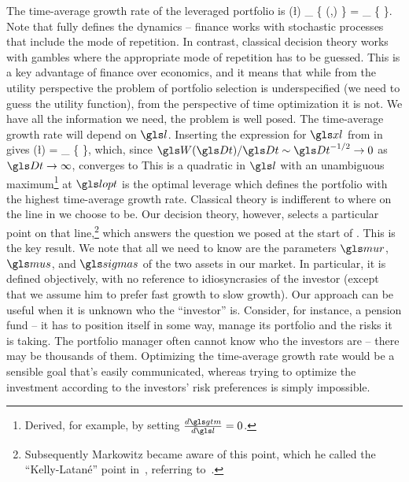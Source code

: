 The time-average growth rate of the leveraged portfolio is
\be
\gtm(\l) \equiv \lim_{\Dt\to\infty} \left\{ \gm(\xl,\Dt) \right\} = \lim_{\Dt\to\infty} \left\{ \frac{\D\ln \xl}{\Dt} \right\}.
\ee
Note that  fully defines the dynamics -- finance works with stochastic processes that include the mode of repetition. In contrast, classical decision theory works with gambles where the appropriate mode of repetition has to be guessed. This is a key advantage of finance over economics, and it means that while from the utility perspective the problem of portfolio selection is underspecified (we need to guess the utility function), from the perspective of time optimization it is not. We have all the information we need, the problem is well posed.
The time-average growth rate will depend on $\l$. Inserting the expression for $\xl$ from  in  gives
\be
\gtm(\l) = \lim_{\Dt\to\infty} \left\{   \right\},
\ee
which, since $\gW(\Dt)/\Dt\sim\Dt^{-1/2}\to0$ as $\Dt\to\infty$, converges to
\be
{}
\ee
This is a quadratic in $\l$ with an unambiguous maximum\footnote{Derived, for example, by setting $\frac{d\gtm}{d\l}=0$.} at
\be
{}
\ee
$\lopt$ is the optimal leverage which defines the portfolio with the highest time-average growth rate. Classical theory is indifferent to where on the line in  we choose to be. Our decision theory, however, selects a particular point on that line,\footnote{Subsequently Markowitz became aware of this point, which he called the ``Kelly-Latan\'{e}'' point in~\cite{Markowitz1976}, referring to~\cite{Kelly1956,Latane1959}.} which answers the question we posed at the start of . This is the key result. We note that all we need to know are the parameters $\mur$, $\mus$, and $\sigmas$ of the two assets in our market. In particular, it is defined objectively, with no reference to idiosyncrasies of the investor (except that we assume him to prefer fast growth to slow growth). Our approach can be useful when it is unknown who the ``investor'' is. Consider, for instance, a pension fund -- it has to position itself in some way, manage its portfolio and the risks it is taking. The portfolio manager often cannot know who the investors are -- there may be thousands of them. Optimizing the time-average growth rate would be a sensible goal that's easily communicated, whereas trying to optimize the investment according to the investors' risk preferences is simply impossible.

